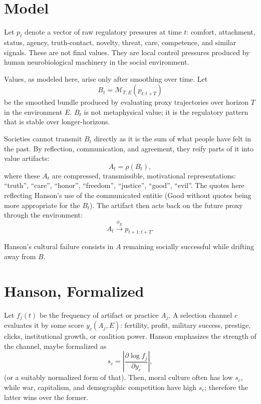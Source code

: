 \documentclass[11pt]{article}
\begin{document}
\section{Model}
Let $p_t$ denote a vector of raw regulatory pressures at time $t$: 
comfort, attachment, status, agency, truth-contact, novelty, threat, care, competence, and similar signals. 
These are not final values. They are local control pressures produced by human neurobiological machinery in the social environment.

Values, as modeled here, arise only after smoothing over time. Let
\begin{equation}
B_t = \mathcal M_{T,E}(p_{t:t+T})
\end{equation}
be the smoothed bundle produced by evaluating proxy trajectories over horizon $T$ in the environment $E$. 
$B_t$ is not metaphysical value; it is the regulatory pattern that is stable over longer-horizons.

Societies cannot transmit $B_t$ directly as it is the sum of what people have felt in the past. 
By reflection, communication, and agreement, they reify parts of it into value artifacts:
\begin{equation}
A_t = \rho(B_t),
\end{equation}
where these $A_t$ are compressed, transmissible, motivational representations: 
``truth'', ``care'', ``honor'', ``freedom'', ``justice'', ``good'', ``evil''. 
The quotes here reflecting Hanson's use of the communicated entitie (Good without quotes being more appropriate for the $B_t$).
The artifact then acts back on the future proxy through the environment:
\begin{equation}
A_t \xrightarrow{\phi_E} p_{t+1:t+T}.
\end{equation}

Hanson's cultural failure consists in $A$ remaining socially successful while drifting away from $B$.

\section{Hanson, Formalized}
Let $f_j(t)$ be the frequency of artifact or practice $A_j$. 
A selection channel $c$ evaluates it by some score $y_c(A_j,E)$: 
fertility, profit, military success, prestige, clicks, institutional growth, or coalition power. 
Hanson emphasizes the strength of the channel, maybe formalized as
\begin{equation}
s_c = \left|\frac{\partial \log f_j}{\partial y_c}\right|,
\end{equation}
(or a suitably normalized form of that). 
Then, moral culture often has low $s_c$, while war, capitalism, and demographic competition have high $s_c$; 
therefore the latter wins over the former.
\end{document}
